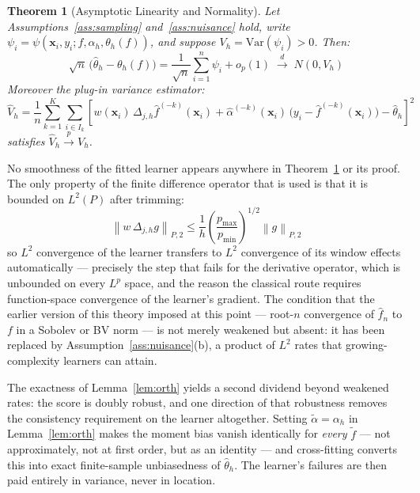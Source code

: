 \documentclass[12pt,a4paper]{article}
\numberwithin{equation}{section}
\theoremstyle{plain}
\newtheorem{theorem}{Theorem}
\theoremstyle{definition}
\newcommand{\norm}[1]{\left\| #1 \right\|}
\newcommand{\fn}{\hat{f}_n}
\newcommand{\xrightarrowp}{\xrightarrow{p}}
\newcommand{\Dh}{\Delta_{j,h}}
\newcommand{\Ptwo}[1]{\norm{#1}_{P,2}}
\begin{document}
	
	\begin{theorem}[Asymptotic Linearity and Normality]
		\label{thm:main}
		Let Assumptions~\ref{ass:sampling} and~\ref{ass:nuisance} hold, write
		$\psi_i = \psi(\mathbf{x}_i, y_i; f, \alpha_h, \theta_h(f))$, and suppose
		$V_h = \mathrm{Var}(\psi_i) > 0$. Then:
		\begin{equation}
			\sqrt{n}\,\bigl(\hat{\theta}_h - \theta_h(f)\bigr)
			= \frac{1}{\sqrt{n}} \sum_{i=1}^n \psi_i + o_p(1)
			\;\xrightarrow{d}\; N(0, V_h)
		\end{equation}
		Moreover the plug-in variance estimator:
		\begin{equation}
			\hat{V}_h = \frac{1}{n} \sum_{k=1}^{K} \sum_{i \in I_k}
			\left[ w(\mathbf{x}_i)\, \Dh \hat{f}^{(-k)}(\mathbf{x}_i)
			+ \hat{\alpha}^{(-k)}(\mathbf{x}_i)\,
			\bigl(y_i - \hat{f}^{(-k)}(\mathbf{x}_i)\bigr)
			- \hat{\theta}_h \right]^2
		\end{equation}
		satisfies $\hat{V}_h \xrightarrowp V_h$.
	\end{theorem}
	
	No smoothness of the fitted learner appears anywhere in
	Theorem~\ref{thm:main} or its proof. The only property of the finite difference
	operator that is used is that it is bounded on $L^2(P)$ after trimming:
	\begin{equation}
		\Ptwo{w\, \Dh g} \leq
		\frac{1}{h} \left(\frac{p_{\max}}{p_{\min}}\right)^{1/2} \Ptwo{g}
		\label{eq:opbound}
	\end{equation}
	so $L^2$ convergence of the learner transfers to $L^2$ convergence of its window
	effects automatically --- precisely the step that fails for the derivative operator,
	which is unbounded on every $L^p$ space, and the reason the classical route
	requires function-space convergence of the learner's gradient. The condition that
	the earlier version of this theory imposed at this point --- root-$n$ convergence
	of $\fn$ to $f$ in a Sobolev or BV norm --- is not merely weakened but absent: it
	has been replaced by Assumption~\ref{ass:nuisance}(b), a product of $L^2$ rates
	that growing-complexity learners can attain.
	
	The exactness of Lemma~\ref{lem:orth} yields a second dividend beyond weakened
	rates: the score is doubly robust, and one direction of that robustness removes the
	consistency requirement on the learner altogether. Setting
	$\tilde{\alpha} = \alpha_h$ in Lemma~\ref{lem:orth} makes the moment bias vanish
	identically for \emph{every} $\tilde{f}$ --- not approximately, not at first order,
	but as an identity --- and cross-fitting converts this into exact finite-sample
	unbiasedness of $\hat{\theta}_h$. The learner's failures are then paid entirely in
	variance, never in location.
	
\end{document}
